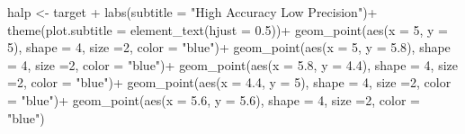 \documentclass[
  letterpaper,
]{book}
\newenvironment{Shaded}{\begin{snugshade}}{\end{snugshade}}
\newcommand{\AttributeTok}[1]{\textcolor[rgb]{0.40,0.45,0.13}{#1}}
\newcommand{\DecValTok}[1]{\textcolor[rgb]{0.68,0.00,0.00}{#1}}
\newcommand{\FloatTok}[1]{\textcolor[rgb]{0.68,0.00,0.00}{#1}}
\newcommand{\FunctionTok}[1]{\textcolor[rgb]{0.28,0.35,0.67}{#1}}
\newcommand{\NormalTok}[1]{\textcolor[rgb]{0.00,0.23,0.31}{#1}}
\newcommand{\OtherTok}[1]{\textcolor[rgb]{0.00,0.23,0.31}{#1}}
\newcommand{\SpecialCharTok}[1]{\textcolor[rgb]{0.37,0.37,0.37}{#1}}
\newcommand{\StringTok}[1]{\textcolor[rgb]{0.13,0.47,0.30}{#1}}
\begin{document}
\begin{Shaded}
\begin{Highlighting}[]
\NormalTok{halp }\OtherTok{\textless{}{-}}\NormalTok{ target }\SpecialCharTok{+}
  \FunctionTok{labs}\NormalTok{(}\AttributeTok{subtitle =} \StringTok{"High Accuracy Low Precision"}\NormalTok{)}\SpecialCharTok{+}
  \FunctionTok{theme}\NormalTok{(}\AttributeTok{plot.subtitle =} \FunctionTok{element\_text}\NormalTok{(}\AttributeTok{hjust =} \FloatTok{0.5}\NormalTok{))}\SpecialCharTok{+}
  \FunctionTok{geom\_point}\NormalTok{(}\FunctionTok{aes}\NormalTok{(}\AttributeTok{x =} \DecValTok{5}\NormalTok{, }\AttributeTok{y =} \DecValTok{5}\NormalTok{), }\AttributeTok{shape =} \DecValTok{4}\NormalTok{, }\AttributeTok{size =}\DecValTok{2}\NormalTok{, }\AttributeTok{color =} \StringTok{"blue"}\NormalTok{)}\SpecialCharTok{+}
  \FunctionTok{geom\_point}\NormalTok{(}\FunctionTok{aes}\NormalTok{(}\AttributeTok{x =} \DecValTok{5}\NormalTok{, }\AttributeTok{y =} \FloatTok{5.8}\NormalTok{), }\AttributeTok{shape =} \DecValTok{4}\NormalTok{, }\AttributeTok{size =}\DecValTok{2}\NormalTok{, }\AttributeTok{color =} \StringTok{"blue"}\NormalTok{)}\SpecialCharTok{+}
  \FunctionTok{geom\_point}\NormalTok{(}\FunctionTok{aes}\NormalTok{(}\AttributeTok{x =} \FloatTok{5.8}\NormalTok{, }\AttributeTok{y =} \FloatTok{4.4}\NormalTok{), }\AttributeTok{shape =} \DecValTok{4}\NormalTok{, }\AttributeTok{size =}\DecValTok{2}\NormalTok{, }\AttributeTok{color =} \StringTok{"blue"}\NormalTok{)}\SpecialCharTok{+}
  \FunctionTok{geom\_point}\NormalTok{(}\FunctionTok{aes}\NormalTok{(}\AttributeTok{x =} \FloatTok{4.4}\NormalTok{, }\AttributeTok{y =} \DecValTok{5}\NormalTok{), }\AttributeTok{shape =} \DecValTok{4}\NormalTok{, }\AttributeTok{size =}\DecValTok{2}\NormalTok{, }\AttributeTok{color =} \StringTok{"blue"}\NormalTok{)}\SpecialCharTok{+}
  \FunctionTok{geom\_point}\NormalTok{(}\FunctionTok{aes}\NormalTok{(}\AttributeTok{x =} \FloatTok{5.6}\NormalTok{, }\AttributeTok{y =} \FloatTok{5.6}\NormalTok{), }\AttributeTok{shape =} \DecValTok{4}\NormalTok{, }\AttributeTok{size =}\DecValTok{2}\NormalTok{, }\AttributeTok{color =} \StringTok{"blue"}\NormalTok{)}


\end{Highlighting}
\end{Shaded}
\end{document}
